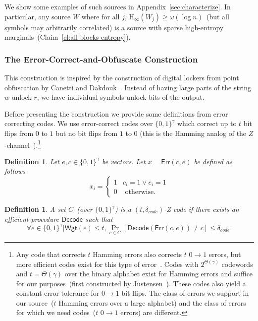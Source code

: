\documentclass[11pt]{article}
\newtheorem{definition}[theorem]{Definition}
\renewcommand{\paragraph}[1]{\subsubsection{#1}}
\newcommand{\apref}[1]{\mbox{Appendix~\ref{#1}}}
\newcommand{\clref}[1]{\mbox{Claim~\ref{#1}}}
\newcommand{\class}[1]{{\ensuremath{\mathsf{#1}}}}
\newcommand{\zo}{\ensuremath{\{0, 1\}}}
\newcommand{\error}{\ensuremath{\class{Err}}\xspace}
\newcommand{\weight}{\ensuremath{\class{Wgt}}\xspace}
\newcommand{\decode}{\ensuremath{\mathsf{Decode}}}
\newcommand{\Hoo}{\mathrm{H}_\infty}
\begin{document}
We show some examples of such sources in \apref{sec:characterize}.  In particular, any source $W$ where for all $j$, $\Hoo(W_j) \geq \omega(\log n)$~(but all symbols may arbitrarily correlated) is a source with sparse high-entropy marginals~(\clref{cl:all blocks entropy}).


\paragraph{The Error-Correct-and-Obfuscate Construction}
This construction is inspired by the construction of digital lockers from point obfuscation by Canetti and Dakdouk~\cite{canetti2008obfuscating}.  Instead of having large parts of the string $w$ unlock $r$, we have individual symbols unlock bits of the output.  

Before presenting the construction we provide some definitions from error correcting codes.
We use error-correct codes over $\{0,1\}^\gamma$ which correct up to $t$ bit flips from $0$ to $1$ but no bit flips from $1$ to $0$ (this is the Hamming analog of the $Z$-channel~\cite{tallini2002capacity}).\footnote{Any code that corrects $t$ Hamming errors also corrects $t$ $0\rightarrow 1$ errors, but more efficient codes  exist for this type of error~\cite{tallini2002capacity}.
Codes with $2^{\Theta(\gamma)}$ codewords and $t = \Theta(\gamma)$ over the binary alphabet exist for Hamming errors and suffice for our purposes~(first constructed by Justensen~\cite{justesen1972class}).  These codes also yield a constant error tolerance for $0\rightarrow 1$ bit flips.
The class of errors we support in our source~($t$ Hamming errors over a large alphabet) and the class of errors for which we need codes~($t$ $0\rightarrow 1$ errors) are different.
}
\begin{definition}
\label{def:hamming z channel}
Let $e, c\in \zo^\gamma$ be vectors.  Let $x = \error(c, e)$ be defined as follows
\[x_i = \begin{cases} 1 & c_i=1 \vee e_i=1\\
0& \text{ otherwise}.\end{cases}\]
\end{definition}

\begin{definition}
A set $C$~(over $\zo^\gamma$) is a $(t, \delta_{code})$-Z code if there exists an efficient procedure $\decode$ such that \[\forall e \in \zo^\gamma | \weight(e)\le t, \Pr_{c\in C}[\decode(\error(c,e)) \neq c] \leq \delta_{code}.\]
\end{definition}
\end{document}
